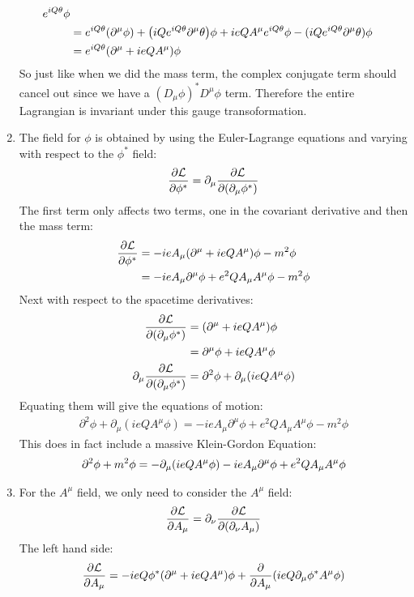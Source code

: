 \documentclass[12pt]{article}
\renewcommand{\L}{\mathcal{L}}
\newcommand{\D}{\partial}
\begin{document}
\begin{enumerate}[label=\alph*)]
\begin{align*}
    e^{iQ\theta}\phi\\
    &=e^{iQ\theta}(\D^\mu\phi)+\qty(iQe^{iQ\theta}\D^\mu\theta)\phi+
    ieQA^\mu e^{iQ\theta}\phi-(iQe^{iQ\theta}\D^\mu\theta)\phi\\
    &=e^{iQ\theta}\qty(\D^\mu+ieQA^\mu)\phi
  \end{align*}
  So just like when we did the mass term, the complex conjugate term should cancel out since we have a $(D_\mu\phi)^*D^\mu\phi$ term. Therefore the entire Lagrangian is invariant under this gauge transoformation. 
\item The field for $\phi$ is obtained by using the Euler-Lagrange equations and varying with respect to the $\phi^*$ field:
  \begin{align*}
    \pdv{\L}{\phi^*}=\D_\mu\pdv{\L}{(\D_\mu\phi^*)}
  \end{align*}
  The first term only affects two terms, one in the covariant derivative and then the mass term:
  \begin{align*}
    \pdv{\L}{\phi^*}&=-ieA_\mu\qty(\D^\mu+ieQA^\mu)\phi-m^2\phi\\
    &=-ieA_\mu\D^\mu\phi+e^2QA_\mu A^\mu\phi-m^2\phi
  \end{align*}
  Next with respect to the spacetime derivatives:
  \begin{align*}
    \pdv{\L}{(\D_\mu\phi^*)}&=\qty(\D^\mu+ieQA^\mu)\phi\\
    &=\D^\mu\phi+ieQA^\mu\phi\\
    \D_\mu\pdv{\L}{(\D_\mu\phi^*)}&=\D^2\phi+\D_\mu\qty(ieQA^\mu\phi)
  \end{align*}
  Equating them will give the equations of motion:
  \begin{align*}
    \D^2\phi+\D_\mu(ieQA^\mu\phi)=-ieA_\mu\D^\mu\phi+e^2QA_\mu A^\mu\phi-m^2\phi
  \end{align*}
  This does in fact include a massive Klein-Gordon Equation:
  \begin{align*}
    \D^2\phi+m^2\phi=
    -\D_\mu\qty(ieQA^\mu\phi)-ieA_\mu\D^\mu\phi+e^2QA_\mu A^\mu\phi
  \end{align*}
\item For the $A^\mu$ field, we only need to consider the $A^\mu$ field:
  \begin{align*}
    \pdv{\L}{A_\mu}=\D_\nu\pdv{\L}{(\D_\nu A_\mu)}
  \end{align*}
  The left hand side:
  \begin{align*}
    \pdv{\L}{A_\mu}&=-ieQ\phi^*\qty(\D^\mu+ieQA^\mu)\phi+
    \pdv{A_\mu}\qty(ieQ\D_\mu\phi^*A^\mu\phi)\\

\end{align*}
\end{enumerate}
\end{document}
